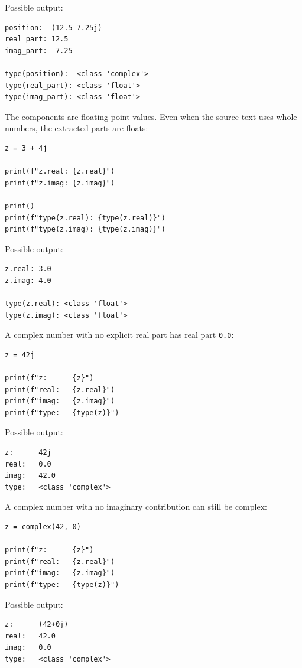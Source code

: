 Possible output:

\begin{verbatim}
position:  (12.5-7.25j)
real_part: 12.5
imag_part: -7.25

type(position):  <class 'complex'>
type(real_part): <class 'float'>
type(imag_part): <class 'float'>
\end{verbatim}

The components are floating-point values. Even when the source text uses whole numbers, the extracted parts are floats:

\begin{verbatim}
z = 3 + 4j

print(f"z.real: {z.real}")
print(f"z.imag: {z.imag}")

print()
print(f"type(z.real): {type(z.real)}")
print(f"type(z.imag): {type(z.imag)}")
\end{verbatim}

Possible output:

\begin{verbatim}
z.real: 3.0
z.imag: 4.0

type(z.real): <class 'float'>
type(z.imag): <class 'float'>
\end{verbatim}

A complex number with no explicit real part has real part \texttt{0.0}:

\begin{verbatim}
z = 42j

print(f"z:      {z}")
print(f"real:   {z.real}")
print(f"imag:   {z.imag}")
print(f"type:   {type(z)}")
\end{verbatim}

Possible output:

\begin{verbatim}
z:      42j
real:   0.0
imag:   42.0
type:   <class 'complex'>
\end{verbatim}

A complex number with no imaginary contribution can still be complex:

\begin{verbatim}
z = complex(42, 0)

print(f"z:      {z}")
print(f"real:   {z.real}")
print(f"imag:   {z.imag}")
print(f"type:   {type(z)}")
\end{verbatim}

Possible output:

\begin{verbatim}
z:      (42+0j)
real:   42.0
imag:   0.0
type:   <class 'complex'>
\end{verbatim}

